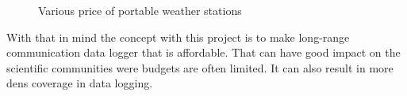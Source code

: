 \begin{figure}[H]
  \centering
  \quad
  \quad
  \quad
  \caption{Various price of portable weather stations}
  \label{fig:1}
\end{figure}

With that in mind the concept with this project is to make long-range communication data logger that is affordable. That can have good impact on the scientific communities were budgets are often limited. It can also result in more dens coverage in data logging. 